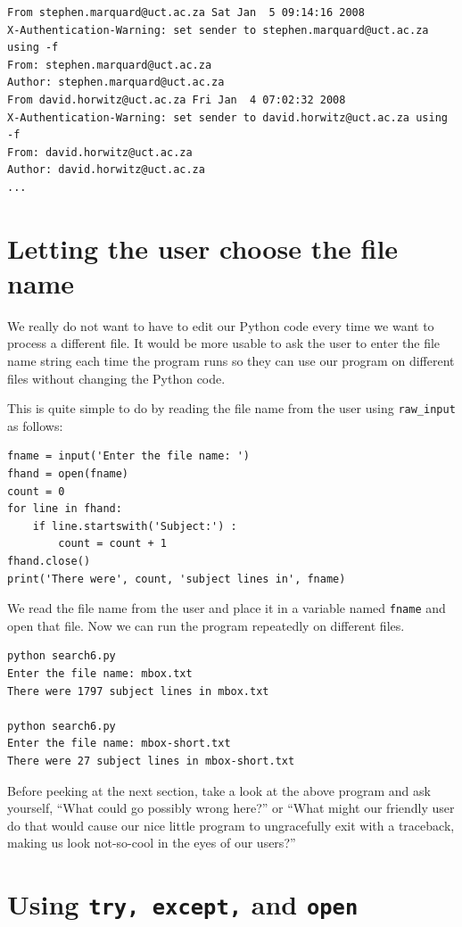 \beforeverb
\begin{verbatim}
From stephen.marquard@uct.ac.za Sat Jan  5 09:14:16 2008
X-Authentication-Warning: set sender to stephen.marquard@uct.ac.za using -f
From: stephen.marquard@uct.ac.za
Author: stephen.marquard@uct.ac.za
From david.horwitz@uct.ac.za Fri Jan  4 07:02:32 2008
X-Authentication-Warning: set sender to david.horwitz@uct.ac.za using -f
From: david.horwitz@uct.ac.za
Author: david.horwitz@uct.ac.za
...
\end{verbatim}
\afterverb
%

\section{Letting the user choose the file name}

We really do not want to have to edit our Python code
every time we want to process a different file.  It would 
be more usable to ask the user to enter the file name string 
each time the program runs so they can use our 
program on different files without changing the Python code.

This is quite simple to do by reading the file name from
the user using \verb"raw_input" as follows:

\beforeverb
\begin{verbatim}
fname = input('Enter the file name: ')
fhand = open(fname)
count = 0
for line in fhand:
    if line.startswith('Subject:') :
        count = count + 1
fhand.close()
print('There were', count, 'subject lines in', fname)
\end{verbatim}
\afterverb
%
We read the file name from the user and place it in a variable
named {\tt fname} and open that file.  Now we can run the program 
repeatedly on different files.

\beforeverb
\begin{verbatim}
python search6.py 
Enter the file name: mbox.txt
There were 1797 subject lines in mbox.txt

python search6.py 
Enter the file name: mbox-short.txt
There were 27 subject lines in mbox-short.txt
\end{verbatim}
\afterverb
%
Before peeking at the next section, take a look at the above program
and ask yourself, ``What could go possibly wrong here?'' or ``What might our
friendly user do that would cause our nice little program to 
ungracefully exit with a traceback, making us look not-so-cool 
in the eyes of our users?''

\section{Using {\tt try, except,} and {\tt open}}

